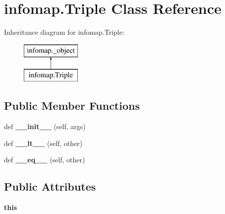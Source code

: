 \hypertarget{classinfomap_1_1Triple}{}\section{infomap.\+Triple Class Reference}
\label{classinfomap_1_1Triple}
Inheritance diagram for infomap.\+Triple\+:\begin{figure}[H]
\begin{center}
\leavevmode
\includegraphics[height=2.000000cm]{classinfomap_1_1Triple}
\end{center}
\end{figure}
\subsection*{Public Member Functions}
\begin{DoxyCompactItemize}
\item 
\mbox{\label{classinfomap_1_1Triple_a69c6cde1eb29a12987ff9086b8ce7768}} 
def {\bfseries \+\_\+\+\_\+init\+\_\+\+\_\+} (self, args)
\item 
\mbox{\label{classinfomap_1_1Triple_ac0931f1f07b7e8574200acd9779032e3}} 
def {\bfseries \+\_\+\+\_\+lt\+\_\+\+\_\+} (self, other)
\item 
\mbox{\label{classinfomap_1_1Triple_a04343691e32b288a1afde22ef4084a41}} 
def {\bfseries \+\_\+\+\_\+eq\+\_\+\+\_\+} (self, other)
\end{DoxyCompactItemize}
\subsection*{Public Attributes}
\begin{DoxyCompactItemize}
\item 
\mbox{\label{classinfomap_1_1Triple_a7f039b07ae99199c18b36508386b779f}} 
{\bfseries this}
\end{DoxyCompactItemize}
